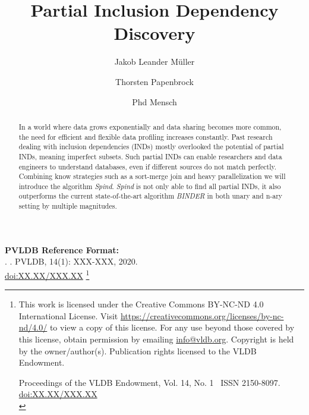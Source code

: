 \documentclass[sigconf, nonacm]{acmart}
\newcommand\vldbdoi{XX.XX/XXX.XX}
\newcommand\vldbpages{XXX-XXX}
\newcommand\vldbvolume{14}
\newcommand\vldbissue{1}
\newcommand\vldbyear{2020}
\newcommand\vldbauthors{\authors}
\newcommand\vldbtitle{\shorttitle}
\newcommand\vldbpagestyle{plain}
\begin{document}
\title{Partial Inclusion Dependency Discovery}

\author{Jakob Leander Müller}

\author{Thorsten Papenbrock}

\author{Phd Mensch}

\begin{abstract}
In a world where data grows exponentially and data sharing becomes more common, the need for efficient and flexible data profiling increases constantly. Past research dealing with inclusion dependencies (INDs) mostly overlooked the potential of partial INDs, meaning imperfect subsets. Such partial INDs can enable researchers and data engineers to understand databases, even if different sources do not match perfectly. Combining know strategies such as a sort-merge join and heavy parallelization we will introduce the algorithm \textit{Spind}. \textit{Spind} is not only able to find all partial INDs, it also outperforms the current state-of-the-art algorithm \textit{BINDER} in both unary and n-ary setting by multiple magnitudes.
\end{abstract}

\maketitle

\pagestyle{\vldbpagestyle}
\begingroup\small\noindent\raggedright\textbf{PVLDB Reference Format:}\\
\vldbauthors. \vldbtitle. PVLDB, \vldbvolume(\vldbissue): \vldbpages, \vldbyear.\\
\href{https://doi.org/\vldbdoi}{doi:\vldbdoi}
\endgroup
\begingroup
\renewcommand\thefootnote{}\footnote{\noindent
This work is licensed under the Creative Commons BY-NC-ND 4.0 International License. Visit \url{https://creativecommons.org/licenses/by-nc-nd/4.0/} to view a copy of this license. For any use beyond those covered by this license, obtain permission by emailing \href{mailto:info@vldb.org}{info@vldb.org}. Copyright is held by the owner/author(s). Publication rights licensed to the VLDB Endowment. \\
\raggedright Proceedings of the VLDB Endowment, Vol. \vldbvolume, No. \vldbissue\ %
ISSN 2150-8097. \\
\href{https://doi.org/\vldbdoi}{doi:\vldbdoi} \\
}\addtocounter{footnote}{-1}\endgroup
\end{document}
